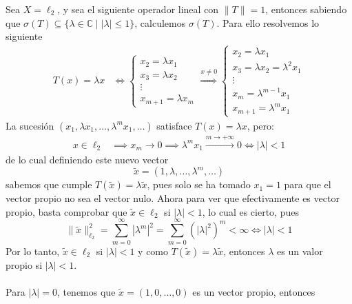 \begin{ejemplo}
    Sea $X = \ell_2$, y sea el siguiente operador lineal
    con $\|T\| = 1$, entonces sabiendo que $\sigma(T) \subseteq \{ \lambda \in \mathbb{C} \mid |\lambda| \leq 1 \}$, calculemos $\sigma(T)$. Para ello resolvemos lo siguiente
    \begin{align*}
        T(x) = \lambda x &\iff
        \begin{cases} 
            x_2 = \lambda x_1 \\ 
            x_3 = \lambda x_2 \\ 
            \vdots \\ 
            x_{m+1} = \lambda x_m 
        \end{cases}
        \overset{x \neq 0}{\Longrightarrow}
        \begin{cases} 
            x_2 = \lambda x_1 \\ 
            x_3 = \lambda x_2 = \lambda^2 x_1 \\ 
            \vdots \\ 
            x_m = \lambda^{m-1} x_1 \\ 
            x_{m+1} = \lambda^m x_1 
        \end{cases}
    \end{align*}
    La sucesión $(x_1, \lambda x_1, \dots, \lambda^m x_1, \dots)$ satisface $T(x) = \lambda x$, pero:
    \begin{align*}
        x \in \ell_2 &\implies x_m \to 0 \implies \lambda^m x_1 \xrightarrow{m \to +\infty} 0 \iff |\lambda| < 1
    \end{align*}
    de lo cual definiendo este nuevo vector
    $$\tilde{x} = (1, \lambda, \dots, \lambda^m, \dots)$$
    sabemos que cumple $T(\tilde{x}) = \lambda \tilde{x}$, pues solo se ha tomado $x_1 = 1$ para que el vector propio no sea el vector nulo. Ahora para ver que efectivamente es vector propio, basta comprobar que $\tilde{x} \in \ell_2$ si $|\lambda| < 1$, lo cual es cierto, pues 
    $$\|\tilde{x}\|_{\ell_2}^2 = \sum_{m=0}^{\infty} |\lambda^{m}|^2 = \sum_{m=0}^{\infty} (|\lambda|^2)^m<\infty \iff |\lambda| < 1$$
    Por lo tanto, $\tilde{x}\in \ell_2$ si $|\lambda| < 1$ y como $T(\tilde{x}) = \lambda \tilde{x}$, entonces $\lambda$ es un valor propio si $|\lambda| < 1$. \\ \\
    Para $|\lambda| = 0$, tenemos que $\tilde{x} = (1, 0, \dots, 0)$ es un vector propio, entonces
    \begin{equation*}

\end{equation*}
\end{ejemplo}
